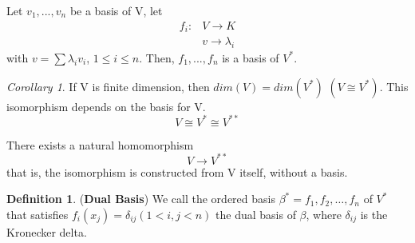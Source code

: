 \documentclass[12pt]{article}
\theoremstyle{definition}
\newtheorem{definition}{Definition}[section]
\theoremstyle{remark}
\newtheorem{corollary}{Corollary}[theorem]
\begin{document}
        \begin{proposition}
            Let $v_1, ... , v_n$ be a basis of V, let 
            \begin{align*}
                f_i:& V \rightarrow K\\
                & v \rightarrow \lambda_i
            \end{align*}
            with $v = \sum \lambda_i v_i$, $1 \leq i \leq n$. Then, $f_1, ..., f_n$ is a basis of $V^*$. 

        \end{proposition}

        \begin{corollary}
            If V is finite dimension, then $dim(V) = dim(V^*)$ $(V\cong V^*)$. This isomorphism depends on the basis for V. 
            $$V \cong V^* \cong V^{**}$$
        \end{corollary}
        \begin{proposition}
            There exists a natural homomorphism 
            $$V\rightarrow V^{**}$$
            that is, the isomorphism is constructed from V itself, without a basis. 
        \end{proposition}
        \begin{definition}(\textbf{Dual Basis})
            We call the ordered basis $\beta^* = {f_1,f_2,\hdots  ,f_n}$ of $V^*$ that satisfies $f_i(x_j) = \delta_{ij} (1 < i,j < n)$ the dual basis of $\beta$, where $\delta_{ij}$ is the Kronecker delta.

        \end{definition}
\end{document}
